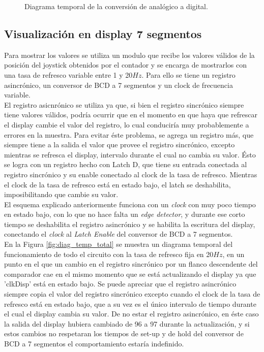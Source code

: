\documentclass[11pt, a4paper]{article}
\begin{document}
%
\begin{figure}[H]
	\centering
	\caption{Diagrama temporal de la conversi\'on de anal\'ogico a digital.}
	\label{fig:diag_temp_ADC}
\end{figure}
%
\subsection{Visualizaci\'on en display 7 segmentos}
\label{sec:mod_visual}
Para mostrar los valores se utiliza un modulo que recibe los valores v\'alidos de la posici\'on del joystick obtenidos por el contador y se encarga de mostrarlos con una tasa de refresco variable entre 1 y 20$Hz$. Para ello se tiene un registro asincr\'onico, un conversor de BCD a 7 segmentos y un clock de frecuencia variable. \\
El registro asicnr\'onico se utiliza ya que, si bien el registro sincr\'onico siempre tiene valores v\'alidos, podr\'ia ocurrir que en el momento en que haya que refrescar el display cambie el valor del registro, lo cual conducir\'ia muy probablemente a errores en la muestra. Para evitar \'este problema, se agrega un registro m\'as, que siempre tiene a la salida el valor que provee el registro sincr\'onico, excepto mientras se refresca el display, intervalo durante el cual no cambia su valor. \'Esto se logra con un registro hecho con Latch D, que tiene su entrada conectada al registro sincr\'onico y su enable conectado al clock de la tasa de refresco. Mientras el clock de la tasa de refresco est\'a en estado bajo, el latch se deshabilita, imposibilitando que cambie su valor.\\
El esquema explicado anteriormente funciona con un \textit{clock} con muy poco tiempo en estado bajo, con lo que no hace falta un \textit{edge detector}, y durante ese corto tiempo se deshabilita el registro asincr\'onico y se habilita la escritura del display, conectando el \textit{clock} al \textit{Latch Enable} del conversor de BCD a 7 segmentos.\\
En la Figura \ref{fig:diag_temp_total} se muestra un diagrama temporal del funcionamiento de todo el circuito con la tasa de refresco fija en 20$Hz$, en un punto en el que un cambio en el registro sincr\'onico por un flanco descendente del comparador cae en el mismo momento que se est\'a actualizando el display ya que 'clkDisp' est\'a en estado bajo. Se puede apreciar que el registro asincr\'onico siempre copia el valor del registro sincr\'onico excepto cuando el clock de la tasa de refresco est\'a en estado bajo, que a su vez es el \'unico intervalo de tiempo durante el cual el display cambia su valor. De no estar el registro asincr\'onico, en \'este caso la salida del display hubiera cambiado de 96 a 97 durante la actualizaci\'on, y si estos cambios no respetaran los tiempos de set-up y de hold del conversor de BCD a 7 segmentos el comportamiento estar\'ia indefinido.
\end{document}

